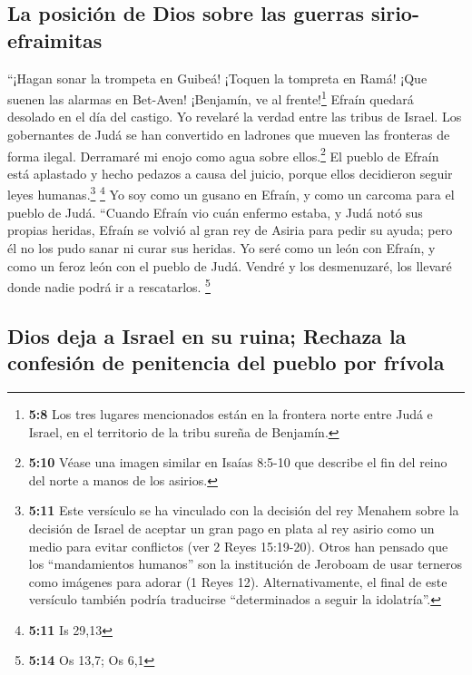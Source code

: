 \hypertarget{la-posiciuxf3n-de-dios-sobre-las-guerras-sirio-efraimitas}{%
\subsection{La posición de Dios sobre las guerras
sirio-efraimitas}\label{la-posiciuxf3n-de-dios-sobre-las-guerras-sirio-efraimitas}}

 ``¡Hagan sonar la trompeta en Guibeá! ¡Toquen la tompreta
en Ramá! ¡Que suenen las alarmas en Bet-Aven! ¡Benjamín, ve al
frente!\footnote{\textbf{5:8} Los tres lugares mencionados están en la
  frontera norte entre Judá e Israel, en el territorio de la tribu
  sureña de Benjamín.}  Efraín quedará desolado en el día
del castigo. Yo revelaré la verdad entre las tribus de Israel.
 Los gobernantes de Judá se han convertido en ladrones
que mueven las fronteras de forma ilegal. Derramaré mi enojo como agua
sobre ellos.\footnote{\textbf{5:10} Véase una imagen similar en Isaías
  8:5-10 que describe el fin del reino del norte a manos de los asirios.}
 El pueblo de Efraín está aplastado y hecho pedazos a
causa del juicio, porque ellos decidieron seguir leyes
humanas.\footnote{\textbf{5:11} Este versículo se ha vinculado con la
  decisión del rey Menahem sobre la decisión de Israel de aceptar un
  gran pago en plata al rey asirio como un medio para evitar conflictos
  (ver 2 Reyes 15:19-20). Otros han pensado que los ``mandamientos
  humanos'' son la institución de Jeroboam de usar terneros como
  imágenes para adorar (1 Reyes 12). Alternativamente, el final de este
  versículo también podría traducirse ``determinados a seguir la
  idolatría''.} \footnote{\textbf{5:11} Is 29,13}  Yo soy
como un gusano en Efraín, y como un carcoma para el pueblo de Judá.
 ``Cuando Efraín vio cuán enfermo estaba, y Judá notó sus
propias heridas, Efraín se volvió al gran rey de Asiria para pedir su
ayuda; pero él no los pudo sanar ni curar sus heridas. 
Yo seré como un león con Efraín, y como un feroz león con el pueblo de
Judá. Vendré y los desmenuzaré, los llevaré donde nadie podrá ir a
rescatarlos. \footnote{\textbf{5:14} Os 13,7; Os 6,1}

\hypertarget{dios-deja-a-israel-en-su-ruina-rechaza-la-confesiuxf3n-de-penitencia-del-pueblo-por-fruxedvola}{%
\subsection{Dios deja a Israel en su ruina; Rechaza la confesión de
penitencia del pueblo por
frívola}\label{dios-deja-a-israel-en-su-ruina-rechaza-la-confesiuxf3n-de-penitencia-del-pueblo-por-fruxedvola}}

